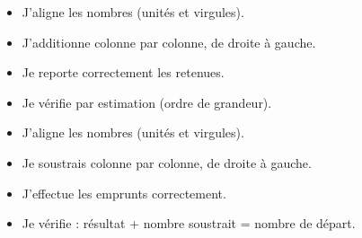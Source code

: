 

\newcommand{\itemcheck}[1]{\item[$\Box$] #1}
\begin{tcbraster}[raster columns=2, raster equal height, raster column skip=4mm, raster row skip=4mm]
\begin{tcolorbox}[colback=themeColor!5, colframe=themeColor, title=Addition, fonttitle=\bfseries]
\begin{itemize}[leftmargin=1.5em, itemsep=3pt]
\itemcheck{J'aligne les nombres (unités et virgules).}
\itemcheck{J'additionne colonne par colonne, de droite à gauche.}
\itemcheck{Je reporte correctement les retenues.}
\itemcheck{Je vérifie par estimation (ordre de grandeur).}
\end{itemize}
\end{tcolorbox}
%
\begin{tcolorbox}[colback=themeColor!5, colframe=themeColor, title=Soustraction, fonttitle=\bfseries]
\begin{itemize}[leftmargin=1.5em, itemsep=3pt]
\itemcheck{J'aligne les nombres (unités et virgules).}
\itemcheck{Je soustrais colonne par colonne, de droite à gauche.}
\itemcheck{J'effectue les emprunts correctement.}
\itemcheck{Je vérifie : résultat + nombre soustrait = nombre de départ.}
\end{itemize}
\end{tcolorbox}
\end{tcbraster}

\bigskip

